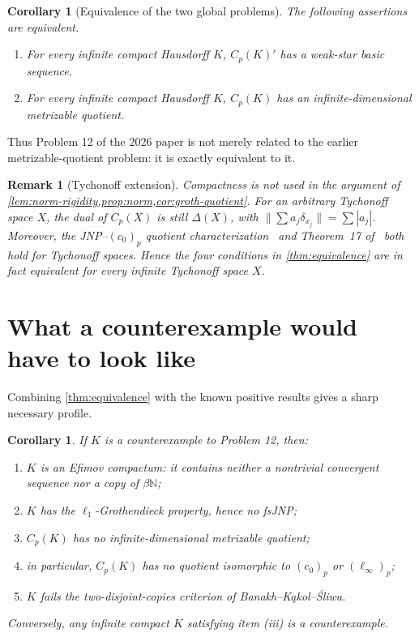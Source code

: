 \documentclass[11pt]{article}
\newtheorem{corollary}[theorem]{Corollary}
\newtheorem{remark}[theorem]{Remark}
\newcommand{\Cp}{C_p}
\newcommand{\N}{\mathbb{N}}
\newcommand{\czerop}{(c_0)_p}
\newcommand{\linfyp}{(\ell_\infty)_p}
\begin{document}
\begin{corollary}[Equivalence of the two global problems]\label{cor:global}
The following assertions are equivalent.
\begin{enumerate}[label=\textup{(\alph*)}]
\item For every infinite compact Hausdorff $K$, $\Cp(K)'$ has a weak-star basic
      sequence.
\item For every infinite compact Hausdorff $K$, $\Cp(K)$ has an
      infinite-dimensional metrizable quotient.
\end{enumerate}
\end{corollary}

Thus Problem 12 of the 2026 paper is not merely related to the earlier
metrizable-quotient problem: it is exactly equivalent to it.

\begin{remark}[Tychonoff extension]\label{rem:tych}
Compactness is not used in the argument of
\cref{lem:norm-rigidity,prop:norm,cor:groth-quotient}.  For an arbitrary
Tychonoff space $X$, the dual of $\Cp(X)$ is still $\Delta(X)$, with
$\|\sum a_j\delta_{x_j}\|=\sum|a_j|$.  Moreover, the JNP--$\czerop$ quotient
characterization~\cite{BKS2019JNP} and Theorem~17 of~\cite{KLS2026} both hold
for Tychonoff spaces.  Hence the four conditions in \cref{thm:equivalence}
are in fact equivalent for every infinite Tychonoff space $X$.
\end{remark}

\section{What a counterexample would have to look like}

Combining \cref{thm:equivalence} with the known positive results gives a sharp
necessary profile.

\begin{corollary}\label{cor:counterexample-profile}
If $K$ is a counterexample to Problem 12, then:
\begin{enumerate}[label=\textup{(\roman*)}]
\item $K$ is an Efimov compactum: it contains neither a nontrivial convergent
      sequence nor a copy of $\beta\N$;
\item $K$ has the $\ell_1$-Grothendieck property, hence no fsJNP;
\item $\Cp(K)$ has no infinite-dimensional metrizable quotient;
\item in particular, $\Cp(K)$ has no quotient isomorphic to $\czerop$ or
      $\linfyp$;
\item $K$ fails the two-disjoint-copies criterion of
      Banakh--K\k{a}kol--\'Sliwa.
\end{enumerate}
Conversely, any infinite compact $K$ satisfying item \textup{(iii)} is a
counterexample.
\end{corollary}
\end{document}
